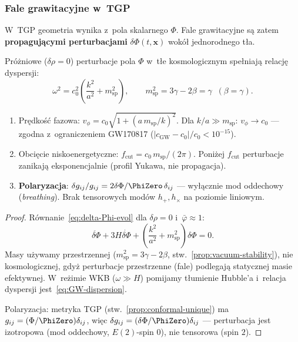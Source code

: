 \subsubsection{Fale grawitacyjne w~TGP}\label{sssec:gw}

W~TGP geometria wynika z~pola skalarnego $\Phi$. Fale grawitacyjne
s\k{a} zatem \textbf{propaguj\k{a}cymi perturbacjami}
$\delta\Phi(t,\mathbf{x})$ wok\'o\l{} jednorodnego t\l{}a.

\begin{proposition}\label{prop:GW-dispersion}
Pr\'o\.zniowe ($\delta\rho = 0$) perturbacje pola $\Phi$ w~t\l{}e
kosmologicznym spe\l{}niaj\k{a} relacj\k{e} dyspersji:
\begin{equation}\label{eq:GW-dispersion}
  \omega^2 = c_0^2\!\left(\frac{k^2}{a^2} + m_{\mathrm{sp}}^2\right),
  \qquad m_{\mathrm{sp}}^2 = 3\gamma - 2\beta = \gamma \;\;(\beta=\gamma).
\end{equation}
\begin{enumerate}[nosep]
  \item Pr\k{e}dko\'s\'c fazowa:
    $v_\phi = c_0\sqrt{1 + (a\,m_{\mathrm{sp}}/k)^2}$.
    Dla $k/a \gg m_{\mathrm{sp}}$: $v_\phi \to c_0$ ---
    zgodna z~ograniczeniem GW170817
    ($|c_{\mathrm{GW}} - c_0|/c_0 < 10^{-15}$).
  \item Obci\k{e}cie niskoenergetyczne:
    $f_{\mathrm{cut}} = c_0\,m_{\mathrm{sp}}/(2\pi)$.
    Poni\.zej $f_{\mathrm{cut}}$ perturbacje zanikaj\k{a} eksponencjalnie
    (profil Yukawa, nie propagacja).
  \item \textbf{Polaryzacja}: $\delta g_{ij}/g_{ij}
    = 2\delta\Phi/\PhiZero\,\delta_{ij}$
    --- wy\l{}\k{a}cznie mod oddechowy (\emph{breathing}).
    Brak tensorowych mod\'ow $h_+, h_\times$ na poziomie liniowym.
\end{enumerate}
\end{proposition}

\begin{proof}
R\'ownanie~\eqref{eq:delta-Phi-evol} dla $\delta\rho = 0$
i~$\bar\varphi \approx 1$:
\[
  \ddot{\delta\Phi} + 3H\dot{\delta\Phi}
  + \left(\frac{k^2}{a^2} + m_{\mathrm{sp}}^2\right)\delta\Phi = 0.
\]
Masy u\.zywamy przestrzennej ($m_{\mathrm{sp}}^2 = 3\gamma - 2\beta$,
stw.~\ref{prop:vacuum-stability}), nie kosmologicznej, gdy\.z perturbacje
przestrzenne (fale) podlegaj\k{a} statycznej masie efektywnej.
W~re\.zimie WKB ($\omega \gg H$) pomijamy t\l{}umienie Hubble'a
i~relacja dyspersji jest~\eqref{eq:GW-dispersion}.

Polaryzacja: metryka TGP (stw.~\ref{prop:conformal-unique}) ma
$g_{ij} = (\Phi/\PhiZero)\delta_{ij}$, wi\k{e}c
$\delta g_{ij} = (\delta\Phi/\PhiZero)\delta_{ij}$ ---
perturbacja jest izotropowa (mod oddechowy, $E(2)$-spin $0$),
nie tensorowa (spin $2$).
\end{proof}

